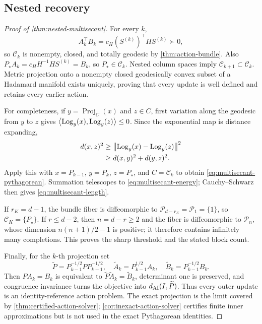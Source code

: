 \subsection{Nested recovery}

\begin{proof}[Proof of \cref{thm:nested-multisecant}]
For every \(k\),
\[
  A_k^\top B_k
  =c_H(S^{(k)})^\top HS^{(k)}\succ0,
\]
so \(\mathscr C_k\) is nonempty, closed, and totally geodesic by
\cref{thm:action-bundle}.  Also
\(P_\star A_k=c_HH^{-1}HS^{(k)}=B_k\), so
\(P_\star\in\mathscr C_k\).  Nested column spaces imply
\(\mathscr C_{k+1}\subset\mathscr C_k\).  Metric projection onto a
nonempty closed geodesically convex subset of a Hadamard manifold exists
uniquely, proving that every update is well defined and retains every earlier
action.

For completeness, if \(y=\operatorname{Proj}_C(x)\) and \(z\in C\), first
variation along the geodesic from \(y\) to \(z\) gives
\(\left\langle \operatorname{Log}_y(x),\operatorname{Log}_y(z)\right\rangle\le0\).  Since the
exponential map is distance expanding,
\[
\begin{aligned}
  d(x,z)^2
  &\ge\left\lVert \operatorname{Log}_y(x)-\operatorname{Log}_y(z)\right\rVert^2\\
  &\ge d(x,y)^2+d(y,z)^2.
\end{aligned}
\]
Apply this with \(x=P_{k-1}\), \(y=P_k\), \(z=P_\star\), and
\(C=\mathscr C_k\) to obtain
\cref{eq:multisecant-pythagorean}.  Summation telescopes to
\cref{eq:multisecant-energy}; Cauchy--Schwarz then gives
\cref{eq:multisecant-length}.

If \(r_K=d-1\), the bundle fiber is diffeomorphic to
\(\mathscr P_{d-r_K}=\mathscr P_1=\{1\}\), so
\(\mathscr C_K=\{P_\star\}\).  If \(r\le d-2\), then
\(n=d-r\ge2\) and the fiber is diffeomorphic to \(\mathscr P_n\), whose
dimension \(n(n+1)/2-1\) is positive; it therefore contains infinitely many
completions.  This proves the sharp threshold and the stated block count.

Finally, for the \(k\)-th projection set
\[
  \widetilde P=P_{k-1}^{-1/2}PP_{k-1}^{-1/2},\quad
  \widetilde A_k=P_{k-1}^{1/2}A_k,\quad
  \widetilde B_k=P_{k-1}^{-1/2}B_k.
\]
Then \(PA_k=B_k\) is equivalent to
\(\widetilde P\widetilde A_k=\widetilde B_k\), determinant one is
preserved, and congruence invariance turns the objective into
\(d_{\mathrm{AI}}(I,\widetilde P)\).  Thus every outer update is an identity-reference
action problem.  The exact projection is the limit covered by
\cref{thm:certified-action-solver}; \cref{cor:inexact-action-solver} certifies
finite inner approximations but is not used in the exact Pythagorean identities.
\end{proof}

